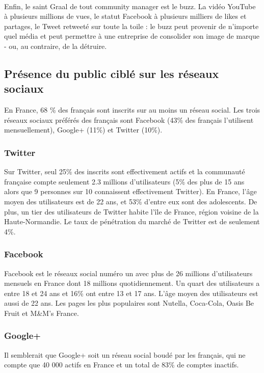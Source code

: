 \paragraph{}
Enfin, le saint Graal de tout community manager est le buzz. La vidéo YouTube à plusieurs millions de vues, 
le statut Facebook à plusieurs milliers de likes et partages, le Tweet retweeté sur toute la toile : le buzz 
peut provenir de n'importe quel média et peut permettre à une entreprise de consolider son image de marque - ou, 
au contraire, de la détruire. 

\subsection{Présence du public ciblé sur les réseaux sociaux}
En France, 68 \% des français sont inscrits sur au moins un réseau social. Les trois réseaux sociaux préférés des français sont Facebook 
(43\% des français l'utilisent mensuellement), Google+ (11\%) et Twitter (10\%).

\subsubsection{Twitter}
Sur Twitter, seul 25\% des inscrits sont effectivement actifs et la communauté française compte seulement 2.3 millions d'utilisateurs 
(5\% des plus de 15 ans alors que 9 personnes sur 10 connaissent effectivement Twitter).
En France, l'âge moyen des utilisateurs est de 22 ans, et 53\% d'entre eux sont des adolescents. De plus, un tier des utilisateurs de 
Twitter habite l'île de France, région voisine de la Haute-Normandie. Le taux de pénétration du marché de Twitter est de seulement 4\%.

\subsubsection{Facebook}
Facebook est le réseaux social numéro un avec plus de 26 millions d'utilisateurs mensuels en France dont 18 millions quotidiennement. Un quart 
des utilisateurs a entre 18 et 24 ans et 16\% ont entre 13 et 17 ans. L'âge moyen des utilisateurs est aussi de 22 ans.
Les pages les plus populaires sont Nutella, Coca-Cola, Oasis Be Fruit et M\&M's France. 

\subsubsection{Google+}
Il semblerait que Google+ soit un réseau social boudé par les français, qui ne compte que 40 000 actifs en France et un total de 83\% de comptes inactifs.
